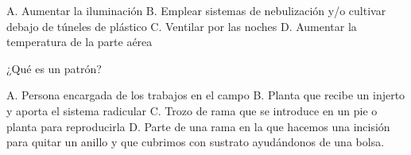 \documentclass[11pt]{exam}
\begin{document}
{\begin{questions}
  \begin{checkboxes}
    \choice A. Aumentar la iluminación
    \CorrectChoice B. Emplear sistemas de nebulización y/o cultivar debajo de túneles de
    plástico
    \choice C. Ventilar por las noches
    \choice D. Aumentar la  temperatura de la parte aérea
  \end{checkboxes}
  \newpage
\question ¿Qué es un patrón?
  \begin{checkboxes}
  \choice A. Persona encargada de los trabajos en el campo
  \CorrectChoice  B. Planta que recibe un injerto y aporta el sistema radicular
  \choice C. Trozo de rama que se introduce en un pie o planta para reproducirla
  \choice D. Parte de una rama en la que hacemos una incisión para quitar un
  anillo y que cubrimos con sustrato ayudándonos de una bolsa.
  \end{checkboxes}
\end{questions}}
\end{document}
